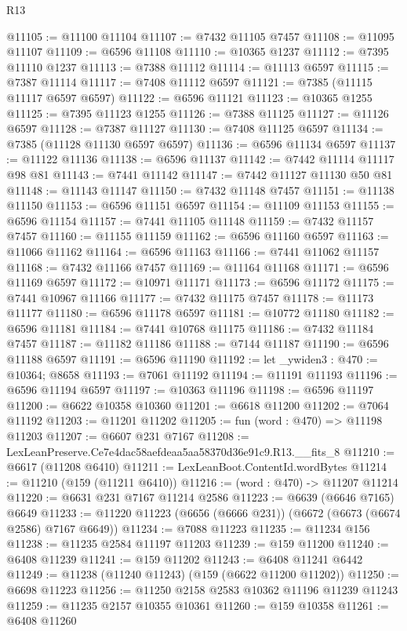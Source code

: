 \begin{lexlean}{R13}
\begin{coremodule}
@11105 := @11100 @11104
@11107 := @7432 @11105 @7457
@11108 := @11095 @11107
@11109 := @6596 @11108
@11110 := @10365 @1237
@11112 := @7395 @11110 @1237
@11113 := @7388 @11112
@11114 := @11113 @6597
@11115 := @7387 @11114
@11117 := @7408 @11112 @6597
@11121 := @7385 (@11115 @11117 @6597 @6597)
@11122 := @6596 @11121
@11123 := @10365 @1255
@11125 := @7395 @11123 @1255
@11126 := @7388 @11125
@11127 := @11126 @6597
@11128 := @7387 @11127
@11130 := @7408 @11125 @6597
@11134 := @7385 (@11128 @11130 @6597 @6597)
@11136 := @6596 @11134 @6597
@11137 := @11122 @11136
@11138 := @6596 @11137
@11142 := @7442 @11114 @11117 @98 @81
@11143 := @7441 @11142
@11147 := @7442 @11127 @11130 @50 @81
@11148 := @11143 @11147
@11150 := @7432 @11148 @7457
@11151 := @11138 @11150
@11153 := @6596 @11151 @6597
@11154 := @11109 @11153
@11155 := @6596 @11154
@11157 := @7441 @11105 @11148
@11159 := @7432 @11157 @7457
@11160 := @11155 @11159
@11162 := @6596 @11160 @6597
@11163 := @11066 @11162
@11164 := @6596 @11163
@11166 := @7441 @11062 @11157
@11168 := @7432 @11166 @7457
@11169 := @11164 @11168
@11171 := @6596 @11169 @6597
@11172 := @10971 @11171
@11173 := @6596 @11172
@11175 := @7441 @10967 @11166
@11177 := @7432 @11175 @7457
@11178 := @11173 @11177
@11180 := @6596 @11178 @6597
@11181 := @10772 @11180
@11182 := @6596 @11181
@11184 := @7441 @10768 @11175
@11186 := @7432 @11184 @7457
@11187 := @11182 @11186
@11188 := @7144 @11187
@11190 := @6596 @11188 @6597
@11191 := @6596 @11190
@11192 := let _ywiden3 : @470 := @10364; @8658
@11193 := @7061 @11192
@11194 := @11191 @11193
@11196 := @6596 @11194 @6597
@11197 := @10363 @11196
@11198 := @6596 @11197
@11200 := @6622 @10358 @10360
@11201 := @6618 @11200
@11202 := @7064 @11192
@11203 := @11201 @11202
@11205 := fun (word : @470) => @11198 @11203
@11207 := @6607 @231 @7167
@11208 := LexLeanPreserve.Ce7e4dac58aefdeaa5aa58370d36e91c9.R13.__fits_8
@11210 := @6617 (@11208 @6410)
@11211 := LexLeanBoot.ContentId.wordBytes
@11214 := @11210 (@159 (@11211 @6410))
@11216 := (word : @470) -> @11207 @11214
@11220 := @6631 @231 @7167 @11214 @2586
@11223 := @6639 (@6646 @7165) @6649
@11233 := @11220 @11223 (@6656 (@6666 @231)) (@6672 (@6673 (@6674 @2586) @7167 @6649))
@11234 := @7088 @11223
@11235 := @11234 @156
@11238 := @11235 @2584 @11197 @11203
@11239 := @159 @11200
@11240 := @6408 @11239
@11241 := @159 @11202
@11243 := @6408 @11241 @6442
@11249 := @11238 (@11240 @11243) (@159 (@6622 @11200 @11202))
@11250 := @6698 @11223
@11256 := @11250 @2158 @2583 @10362 @11196 @11239 @11243
@11259 := @11235 @2157 @10355 @10361
@11260 := @159 @10358
@11261 := @6408 @11260

\end{coremodule}
\end{lexlean}
